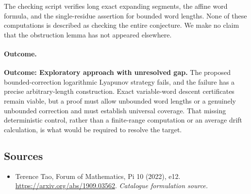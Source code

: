 \documentclass[11pt,a4paper]{article}
\numberwithin{equation}{section}
\begin{document}
The checking script verifies long exact expanding segments, the affine word formula, and the single-residue assertion for bounded word lengths. None of these computations is described as checking the entire conjecture. We make no claim that the obstruction lemma has not appeared elsewhere.

\paragraph{Outcome.}
\textbf{Outcome: Exploratory approach with unresolved gap.}
The proposed bounded-correction logarithmic Lyapunov strategy fails, and the failure has a precise arbitrary-length construction. Exact variable-word descent certificates remain viable, but a proof must allow unbounded word lengths or a genuinely unbounded correction and must establish universal coverage. That missing deterministic control, rather than a finite-range computation or an average drift calculation, is what would be required to resolve the target.

\subsection{Sources}
\begin{itemize}\raggedright
\item[\textnormal{[S1]}]\hypertarget{source:9:1}{} Terence Tao, Forum of Mathematics, Pi 10 (2022), e12.
\url{https://arxiv.org/abs/1909.03562}.
{\small\textit{Catalogue formulation source.}}
\end{itemize}
\end{document}
